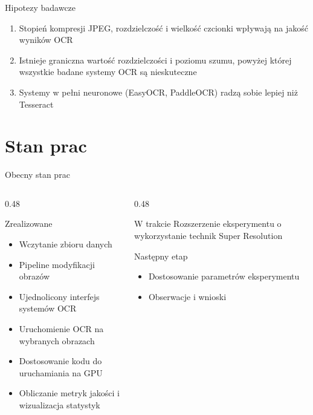 \documentclass[aspectratio=169,11pt]{beamer}
\begin{document}
\begin{frame}{Hipotezy badawcze}
  \begin{enumerate}
    \item[\textbf{H1}] Stopień kompresji JPEG, rozdzielczość i wielkość czcionki wpływają na jakość wyników OCR
    \vspace{0.6em}
    \item[\textbf{H2}] Istnieje graniczna wartość rozdzielczości i poziomu szumu, powyżej której wszystkie badane systemy OCR są nieskuteczne
    \vspace{0.6em}
    \item[\textbf{H3}] Systemy w pełni neuronowe (EasyOCR, PaddleOCR) radzą sobie lepiej niż Tesseract
  \end{enumerate}
\end{frame}

\section{Stan prac}

\begin{frame}{Obecny stan prac}
  \begin{columns}[T]
    \begin{column}{0.48\textwidth}
      \begin{block}{Zrealizowane}
        \begin{itemize}
          \item Wczytanie zbioru danych
          \item Pipeline modyfikacji obrazów
          \item Ujednolicony interfejs systemów OCR
          \item Uruchomienie OCR na wybranych obrazach
          \item Dostosowanie kodu do uruchamiania na GPU
          \item Obliczanie metryk jakości i wizualizacja statystyk
        \end{itemize}
      \end{block}
    \end{column}
    \begin{column}{0.48\textwidth}
      \begin{alertblock}{W trakcie}
        Rozszerzenie eksperymentu o wykorzystanie technik Super Resolution
      \end{alertblock}
      \begin{exampleblock}{Następny etap}
          \begin{itemize}
          \item Dostosowanie parametrów eksperymentu
          \item Obserwacje i wnioski
          \end{itemize}
       
      \end{exampleblock}
    \end{column}
  \end{columns}
\end{frame}
\end{document}
